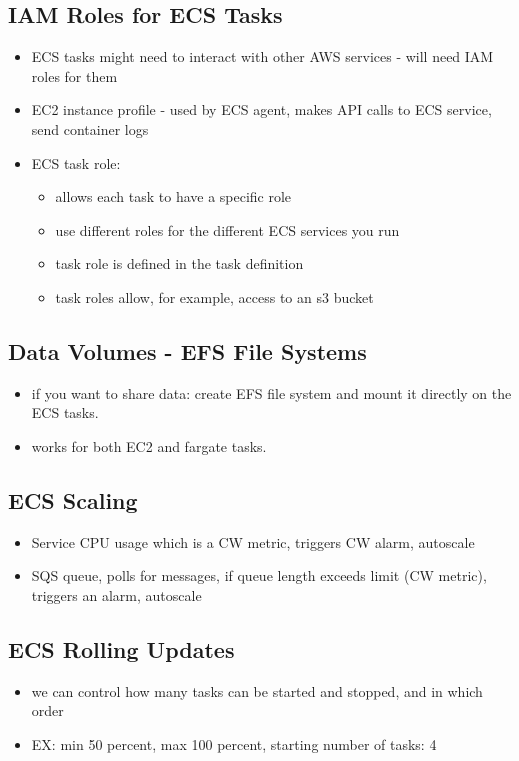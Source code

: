 \documentclass[]{scrartcl}
\begin{document}
\subsection{IAM Roles for ECS Tasks}
\begin{itemize}
	\item ECS tasks might need to interact with other AWS services - will need IAM roles for them
	\item EC2 instance profile - used by ECS agent, makes API calls to ECS service, send container logs
	\item ECS task role:
	\begin{itemize}
		\item allows each task to have a specific role
		\item use different roles for the different ECS services you run
		\item task role is defined in the task definition
		\item task roles allow, for example, access to an s3 bucket
	\end{itemize}
\end{itemize}

\subsection{Data Volumes - EFS File Systems}
\begin{itemize}
	\item if you want to share data: create EFS file system and mount it directly on the ECS tasks.
	\item works for both EC2 and fargate tasks. 
\end{itemize}

\subsection{ECS Scaling}
\begin{itemize}
	\item Service CPU usage which is a CW metric, triggers CW alarm, autoscale
	\item SQS queue, polls for messages, if queue length exceeds limit (CW metric), triggers an alarm, autoscale
\end{itemize}

\subsection{ECS Rolling Updates}
\begin{itemize}
	\item we can control how many tasks can be started and stopped, and in which order
	\item EX: min 50 percent, max 100 percent, starting number of tasks: 4
\end{itemize}
\end{document}
